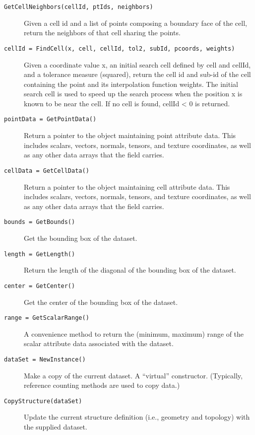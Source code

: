 \begin{description}
\begin{description}
    \item[\texttt{GetCellNeighbors(cellId, ptIds, neighbors)}]
    Given a cell id and a list of points composing a boundary face of the cell, return the neighbors of that cell sharing the points.

    \item[\texttt{cellId = FindCell(x, cell, cellId, tol2, subId, pcoords, weights)}] 
    Given a coordinate value x, an initial search cell defined by cell and cellId, and a tolerance measure (squared), return the cell id and sub-id of the cell containing the point and its interpolation function weights. The initial search cell is used to speed up the search process when the position x is known to be near the cell. If no cell is found, cellId < 0 is returned.

    \item[\texttt{pointData = GetPointData()}]
    Return a pointer to the object maintaining point attribute data. This includes scalars, vectors, normals, tensors, and texture coordinates, as well as any other data arrays that the field carries.

    \item[\texttt{cellData = GetCellData()}]
    Return a pointer to the object maintaining cell attribute data. This includes scalars, vectors, normals, tensors, and texture coordinates, as well as any other data arrays that the field carries.

    \item[\texttt{bounds = GetBounds()}]
    Get the bounding box of the dataset.

    \item[\texttt{length = GetLength()}]
    Return the length of the diagonal of the bounding box of the dataset.

    \item[\texttt{center = GetCenter()}]
    Get the center of the bounding box of the dataset.

    \item[\texttt{range = GetScalarRange()}]
    A convenience method to return the (minimum, maximum) range of the scalar attribute data associated with the dataset.

    \item[\texttt{dataSet = NewInstance()}]
    Make a copy of the current dataset. A ``virtual'' constructor. (Typically, reference counting methods are used to copy data.)

    \item[\texttt{CopyStructure(dataSet)}]
    Update the current structure definition (i.e., geometry and topology) with the supplied dataset.
    \end{description}


\end{description}
